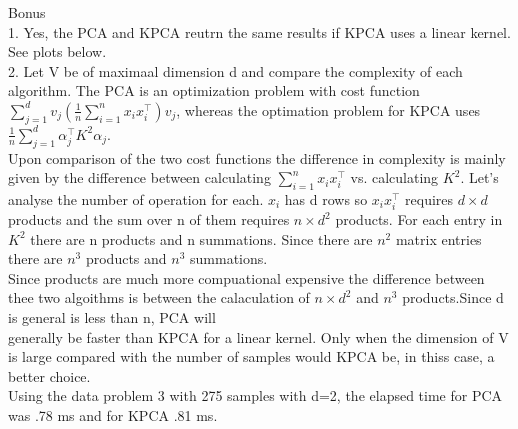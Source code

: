 \documentclass[18pt]{article}
\begin{document}
\begin{flushleft}
Bonus\\
\vspace{.4cm}
1. Yes, the PCA and KPCA reutrn the same results if KPCA uses a linear kernel. See plots below.\\
\vspace{.4cm}
2. Let V be of maximaal dimension d and compare the complexity of each algorithm.
\vspace{.4cm}
The PCA is an optimization problem with cost function\\
$\sum\limits_{j=1}^d v_j (\frac{1}{n} \sum\limits_{i=1}^n x_i x_i^{\top}) v_j$, whereas the optimation problem for KPCA uses\\
$\frac{1}{n}\sum\limits_{j=1}^d \alpha_j^{\top} K^2 \alpha_j$.\\
\vspace{.4cm}
Upon comparison of the two cost functions the difference in complexity is mainly given by the difference between
calculating $\sum\limits_{i=1}^n x_i x_i^{\top}$ vs. calculating $K^2$. Let's analyse the number of operation for each.
$x_i$ has d rows so $x_i x_i^{\top}$ requires $d \times d$ products and the sum over n of them requires $n\times d^2$ products.
For each entry in $K^2$ there are n products and n summations. Since there are $n^2$ matrix entries there are $n^3$ products and $n^3$ summations.\\
\vspace{.4cm}
Since products are much more compuational expensive the difference between thee two algoithms is between the calaculation of $n \times d^2$ and $n^3$ products.Since d is general is less than n, PCA will \\
generally be faster than KPCA for a linear kernel. Only when the dimension of V is large compared with the number of samples would KPCA be, in thiss case, a better choice.\\
Using the data problem 3 with 275 samples with d=2, the elapsed time for PCA was .78 ms and for KPCA .81 ms.\\


\end{flushleft}
\end{document}

